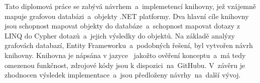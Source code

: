 Tato diplomová práce se zabývá návrhem~a~implemetencí knihovny, jež vzájemně mapuje grafovou databázi~a~objekty .NET platformy.
Dva hlavní cíle knihovny jsou schopnost mapovat objekty do databáze~a~schopnost mapovat dotazy z LINQ do Cypher dotazů~a~jejich výsledky do objektů.
Na základě analýzy grafovách databazí, Entity Frameworku~a~podobných řešení, byl vytvořen návrh knihovny.
Knihovna je nápsána v jazyce \CS\ jakožto ověření konceptu~a~má tedy omezenou funkčnost, zdrojové kódy jsou k dispozici~na~\mbox{GitHubu}.
V~závěru je zhodnocen výsledek implementace~a~jsou předloženy návrhy~na~další vývoj.
